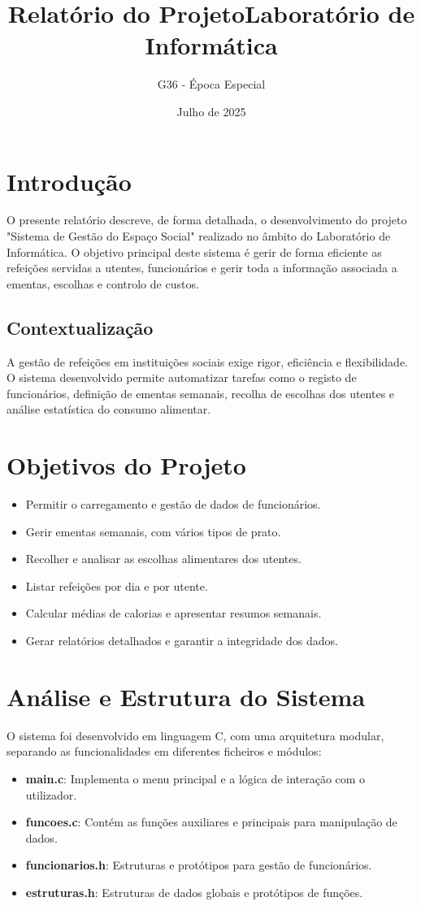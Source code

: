 \documentclass[a4paper,12pt]{report}
\title{Relatório do Projeto\newline Laboratório de Informática}
\author{G36 - Época Especial}
\date{Julho de 2025}
\begin{document}
\maketitle
\tableofcontents
\chapter{Introdução}
O presente relatório descreve, de forma detalhada, o desenvolvimento do projeto "Sistema de Gestão do Espaço Social" realizado no âmbito do Laboratório de Informática. O objetivo principal deste sistema é gerir de forma eficiente as refeições servidas a utentes, funcionários e gerir toda a informação associada a ementas, escolhas e controlo de custos.

\section{Contextualização}
A gestão de refeições em instituições sociais exige rigor, eficiência e flexibilidade. O sistema desenvolvido permite automatizar tarefas como o registo de funcionários, definição de ementas semanais, recolha de escolhas dos utentes e análise estatística do consumo alimentar.

\chapter{Objetivos do Projeto}
\begin{itemize}
    \item Permitir o carregamento e gestão de dados de funcionários.
    \item Gerir ementas semanais, com vários tipos de prato.
    \item Recolher e analisar as escolhas alimentares dos utentes.
    \item Listar refeições por dia e por utente.
    \item Calcular médias de calorias e apresentar resumos semanais.
    \item Gerar relatórios detalhados e garantir a integridade dos dados.
\end{itemize}

\chapter{Análise e Estrutura do Sistema}
O sistema foi desenvolvido em linguagem C, com uma arquitetura modular, separando as funcionalidades em diferentes ficheiros e módulos:
\begin{itemize}
    \item \textbf{main.c}: Implementa o menu principal e a lógica de interação com o utilizador.
    \item \textbf{funcoes.c}: Contém as funções auxiliares e principais para manipulação de dados.
    \item \textbf{funcionarios.h}: Estruturas e protótipos para gestão de funcionários.
    \item \textbf{estruturas.h}: Estruturas de dados globais e protótipos de funções.
\end{itemize}
\end{document}
